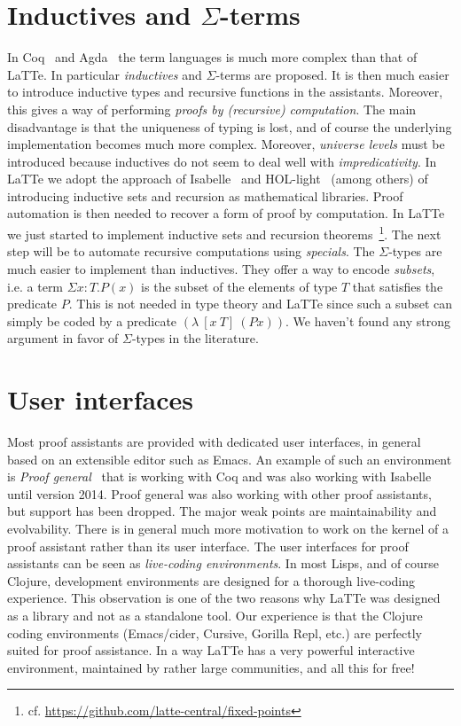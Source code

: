 \documentclass{styles/sig-alternate-05-2015}
\begin{document}
\section*{Inductives and $\Sigma$-terms} In Coq~\cite{coq} and Agda~\cite{agda} the term languages is
much more complex than that of LaTTe. In particular \emph{inductives} and $\Sigma$-terms are proposed.
It is then much easier to introduce inductive types and recursive functions in the assistants. Moreover, this gives
a way of performing \emph{proofs by (recursive) computation}. The main disadvantage is that the uniqueness of typing
is lost, and of course the underlying implementation becomes much more complex. Moreover, \emph{universe levels} must be
introduced because inductives do not seem to deal well with \emph{impredicativity}. In LaTTe we adopt the approach
of Isabelle~\cite{isabelle} and HOL-light~\cite{harrison-hollight} (among others) of introducing inductive sets and recursion
as mathematical libraries. Proof automation is then needed to recover a form of proof by computation. In LaTTe we
just started to implement inductive sets and recursion theorems~\footnote{cf. \url{https://github.com/latte-central/fixed-points}}.
The next step will be to automate recursive computations using \emph{specials}. The $\Sigma$-types are much
easier to implement than inductives. They offer a way to encode \emph{subsets}, i.e. a term $\Sigma x:T.P(x)$ is the
subset of the elements of type $T$ that satisfies the predicate $P$. This is not needed in type theory and LaTTe since such
a subset can simply be coded by a predicate $(\lambda~[x~T]~(P x))$. We haven't found any strong argument
in favor of $\Sigma$-types in the literature.

\section*{User interfaces} Most proof assistants are provided with dedicated user interfaces, in general based
on an extensible editor such as Emacs. An example of such an environment is \emph{Proof general}~\cite{proof-general} that
is working with Coq and was also working with Isabelle until version 2014. Proof general was also working with
other proof assistants, but support has been dropped. The major weak points are maintainability and evolvability.
There is in general much more motivation to work on the kernel of a proof assistant rather than its user interface.
The user interfaces for proof assistants can be seen as \emph{live-coding environments}. In most Lisps, and of course Clojure,
 development environments are designed for a thorough live-coding experience. This observation is one
 of the two reasons why LaTTe was designed as a library and not as a standalone tool. Our experience is that
 the Clojure coding environments (Emacs/cider, Cursive, Gorilla Repl, etc.) are perfectly suited for proof assistance. In a
 way LaTTe has a very powerful interactive environment, maintained by rather large communities, and all this for free!
\end{document}
